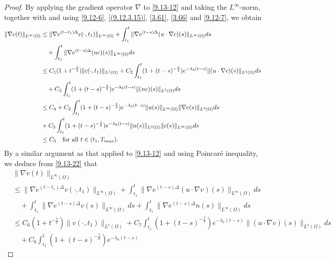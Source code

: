 \documentclass[10pt,a4paper]{amsart}
\numberwithin{equation}{section}
\begin{document}
\begin{proof}
By applying the gradient operator $\nabla$ to \eqref{9.13-12} and taking the 
$L^\infty$-norm, together with and using \eqref{9.12-6}, \eqref{(9.12.3.15)},
 \eqref{3.61}, \eqref{3.66} and \eqref{9.12-7}, we obtain
\begin{equation} \label{3.71}
\begin{aligned}
\|\nabla c(t)\|_{L^\infty(\Omega)}
&\leq \| \nabla e^{(t-t_1)\Delta} c(\cdot,t_1) \|_{L^\infty(\Omega)}
+ \int_{t_1}^t \| \nabla e^{(t - s)\Delta} (u \cdot \nabla c)(s) \|_{L^\infty(\Omega)} ds\\
&\quad + \int_{t_1}^t \| \nabla e^{(t - s)\Delta} (n c)(s)\|_{L^\infty(\Omega)} ds \\
&\leq C_1 ( 1 + t^{-\frac{3}{2}}) \| c(\cdot,t_1)\|_{L^1(\Omega)}
 + C_2 \int_{t_1}^t ( 1 + (t - s)^{-\frac{3}{4}} ) e^{-\lambda_5(t - s)}
  \| (u \cdot \nabla c)(s) \|_{L^4(\Omega)} ds \\
&\quad + C_3 \int_{t_1}^t ( 1 + (t - s)^{-\frac{5}{6}} ) e^{-\lambda_6(t - s)}
 \| (n c)(s) \|_{L^3(\Omega)} ds  \\
&\leq C_4 + C_2 \int_{t_1}^t ( 1 + (t - s)^{-\frac{3}{4}} ) e^{-\lambda_5(t - s)}
 \| u(s) \|_{L^\infty(\Omega)} \| \nabla c(s) \|_{L^4(\Omega)} ds \nonumber\\
&+ C_3 \int_{t_1}^t ( 1 + (t - s)^{-\frac{5}{6}} ) e^{-\lambda_6(t - s)}
 \| n(s) \|_{L^3(\Omega)} \| c(s) \|_{L^\infty(\Omega)} ds \\
&\leq C_5  \quad  \text{for all } t \in (t_1, T_{\rm max}).
\end{aligned}
\end{equation}
By a similar argument as that applied to \eqref{9.13-12} and using Poincar\'e
inequality, we deduce from \eqref{9.13-22} that
\begin{equation} \label{3.72}
\begin{aligned}
&\|\nabla v(t)\|_{L^\infty(\Omega)}\\
&\leq \| \nabla e^{(t-t_1)\Delta} v(\cdot, t_1) \|_{L^\infty(\Omega)}
+ \int_{t_1}^t \| \nabla e^{(t - s)\Delta} (u \cdot \nabla v)(s) \|_{L^\infty(\Omega)}ds
 \\
&\quad + \int_{t_1}^t \| \nabla e^{(t - s)\Delta} v(s) \|_{L^\infty(\Omega)} ds
+ \int_{t_1}^t \| \nabla e^{(t - s)\Delta} n(s) \|_{L^\infty(\Omega)} ds \\
&\leq C_6 ( 1 + t^{-\frac{3}{2}} ) \|v(\cdot, t_1)\|_{L^1(\Omega)}
 + C_7 \int_{t_1}^t ( 1 + (t - s)^{-\frac{3}{4}} ) e^{-\lambda_7(t - s)} \| (u \cdot \nabla
v)(s) \|_{L^4(\Omega)} ds  \\
&\quad + C_8 \int_{t_1}^t ( 1 + (t - s)^{-\frac{5}{6}} ) e^{-\lambda_8(t - s)}

\end{aligned}
\end{equation}
\end{proof}
\end{document}
